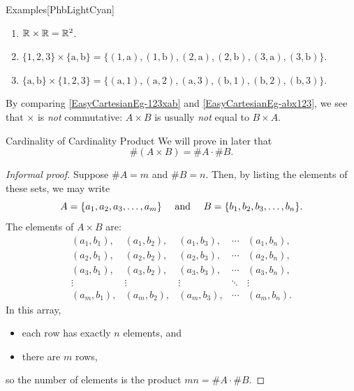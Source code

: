 \documentclass[../MATH-2000-Notes.tex]{subfiles}
\begin{document}
\begin{commentbox}{Examples}[{PhbLightCyan}]
    \begin{enumerate}
        \item $\mathbb{R} \times \mathbb{R} = \mathbb{R}^2$.
        \item \label{EasyCartesianEg-123xab}
              $\{1,2,3\} \times \{\text{a}, \text{b} \} =
                  \bigl\{ (1,\text{a}), (1,\text{b}), (2,\text{a}), (2,\text{b}), (3,\text{a}), (3,\text{b}) \bigr\}$.
        \item \label{EasyCartesianEg-abx123}
              $\{\text{a}, \text{b} \} \times \{1,2,3\}  =
                  \bigl\{ (\text{a},1), (\text{a},2), (\text{a},3), (\text{b},1), (\text{b},2), (\text{b},3) \bigr\}$.
    \end{enumerate}
    By comparing \ref{EasyCartesianEg-123xab} and \ref{EasyCartesianEg-abx123}, we see that $\times$ is \emph{not} commutative: $A \times B$ is usually \emph{not} equal to $B \times A$.
\end{commentbox}
\begin{Note}
    {Cardinality of Cardinality Product}
    \label{Card(AxB)Rem}
    We will prove in later that
    $$\#(A \times B) = \#A \cdot \#B .$$
\end{Note}
\begin{proof}[Informal proof]
    Suppose $\#A = m$ and $\#B = n$. Then, by listing the elements of these sets, we may write
    $$ \text{$A = \{a_1,a_2,a_3,\ldots,a_m\}$ \quad and \quad $B = \{b_1,b_2,b_3,\ldots,b_n\}$.} $$
    The elements of $A \times B$ are:
    $$ \begin{matrix}
            (a_1,b_1), & (a_1,b_2), & (a_1,b_3), & \cdots & (a_1,b_n), \\
            (a_2,b_1), & (a_2,b_2), & (a_2,b_3), & \cdots & (a_2,b_n), \\
            (a_3,b_1), & (a_3,b_2), & (a_3,b_3), & \cdots & (a_3,b_n), \\
            \vdots     & \vdots     & \vdots     & \ddots & \vdots     \\
            (a_m,b_1), & (a_m,b_2), & (a_m,b_3), & \cdots & (a_m,b_n)
            .\end{matrix}$$
    In this array,
    \begin{itemize}
        \item each row has exactly $n$ elements, and
        \item there are $m$ rows,
    \end{itemize}
    so the number of elements is the product $m n = \#A \cdot \#B$.
\end{proof}
\end{document}
